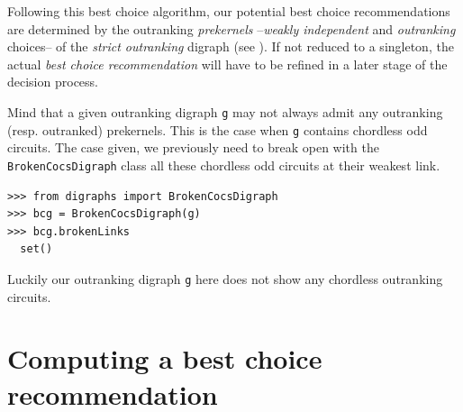 Following this best choice algorithm, our potential best choice recommendations are determined by the outranking \emph{prekernels} --\emph{weakly independent} and \emph{outranking} choices-- of the \emph{strict outranking} digraph (see \citet{BIS-2008a}). If not reduced to a singleton, the actual \emph{best choice recommendation} will have to be refined in a later stage of the decision process.

Mind that a given outranking digraph \texttt{g} may not always admit any outranking (resp. outranked) prekernels. This is the case when \texttt{g} contains chordless odd circuits. The case given, we previously need to break open with the \texttt{BrokenCocsDigraph} class all these chordless odd circuits at their weakest link.
\begin{lstlisting}
>>> from digraphs import BrokenCocsDigraph
>>> bcg = BrokenCocsDigraph(g)
>>> bcg.brokenLinks
  set()
\end{lstlisting}
Luckily our outranking digraph \texttt{g} here does not show any chordless outranking circuits.

\section{Computing a best choice recommendation}
\label{sec:4.4}

